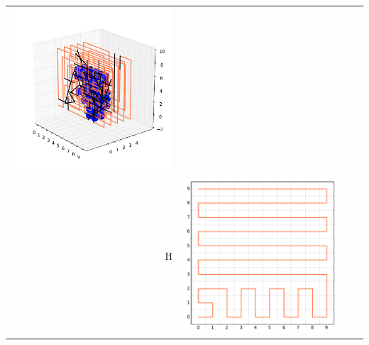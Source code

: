 \documentclass{beamer}
\begin{document}
\begin{frame}
\begin{tabular}{rccc}
    \includegraphics[width=\fw]{3d_coverage_nn.pdf} \\
    \raisebox{1.5cm}H &
    \includegraphics[width=\fw]{2d_coverage_heur_empty.pdf} &

\end{tabular}
\end{frame}
\end{document}

